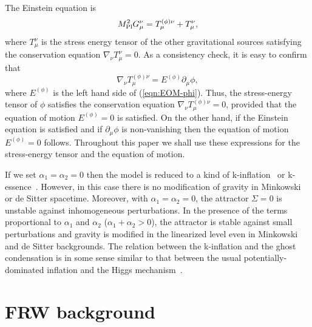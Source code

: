 The Einstein equation is 
%
\begin{equation}
 M_{\rm Pl}^2G_{\mu}^{\nu} = T^{(\phi)\nu}_{\mu} + T_{\mu}^{\nu},
\end{equation}
where $T_{\mu}^{\nu}$ is the stress energy tensor of the other
gravitational sources satisfying the conservation equation 
$\nabla_{\nu}T_{\mu}^{\nu}=0$. As a consistency check, it is easy to
confirm that 
%
\begin{equation}
 \nabla_{\nu}T^{(\phi)\nu}_{\mu} = E^{(\phi)}\partial_{\mu}\phi, 
  \label{eqn:conservation-phi}
\end{equation}
where $E^{(\phi)}$ is the left hand side of (\ref{eqn:EOM-phi}). Thus,
the stress-energy tensor of $\phi$ satisfies the conservation equation 
$\nabla_{\nu}T^{(\phi)\nu}_{\mu}=0$, provided that the equation of
motion $E^{(\phi)}=0$ is satisfied. On the other hand, if the Einstein
equation is satisfied and if $\partial_{\mu}\phi$ is non-vanishing then
the equation of motion $E^{(\phi)}=0$ follows. Throughout this paper we
shall use these expressions for the stress-energy tensor and the
equation of motion. 



If we set $\alpha_1=\alpha_2=0$ then the model is reduced to a kind of 
k-inflation~\cite{Armendariz-Picon:1999rj} or
k-essence~\cite{Chiba:1999ka,Armendariz-Picon:2000dh,Armendariz-Picon:2000ah}.
However, in this case there is no modification of gravity in Minkowski 
or de Sitter spacetime. Moreover, with $\alpha_1=\alpha_2=0$, the
attractor $\Sigma=0$ is unstable against inhomogeneous perturbations. In
the presence of the terms proportional to $\alpha_1$ and $\alpha_2$
($\alpha_1+\alpha_2>0$), the attractor is stable against small
perturbations and gravity is modified in the linearized level even in
Minkowski and de Sitter backgrounds. The relation between the
k-inflation and the ghost condensation is in some sense similar to that
between the usual potentially-dominated inflation and the Higgs
mechanism~\cite{Mukohyama:2005qd}.  




\section{FRW background}
\label{sec:FRWbackground}


